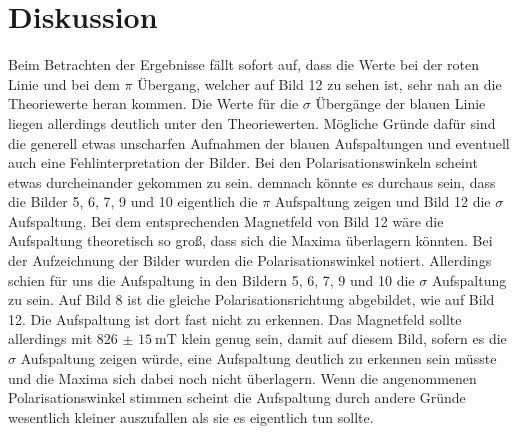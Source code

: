 \documentclass[
  bibliography=totoc,     %
  captions=tableheading,  %
  titlepage=firstiscover, %
]{scrartcl}
\begin{document}
\section{Diskussion}
Beim Betrachten der Ergebnisse fällt sofort auf, dass die Werte bei der roten Linie
und bei dem $\pi$ Übergang, welcher auf Bild 12 zu sehen ist, sehr nah an die Theoriewerte heran kommen.
Die Werte für die $\sigma$ Übergänge der blauen Linie liegen allerdings deutlich unter den Theoriewerten.
Mögliche Gründe dafür sind die generell etwas unscharfen Aufnahmen der blauen Aufspaltungen und eventuell
auch eine Fehlinterpretation der Bilder. Bei den Polarisationswinkeln scheint etwas durcheinander gekommen zu sein.
demnach könnte es durchaus sein, dass die Bilder 5, 6, 7, 9 und 10 eigentlich die $\pi$ Aufspaltung zeigen und Bild 12 die
$\sigma$ Aufspaltung. Bei dem entsprechenden Magnetfeld von Bild 12 wäre die Aufspaltung theoretisch so groß, dass sich die Maxima überlagern
könnten. Bei der Aufzeichnung der Bilder wurden die Polarisationswinkel notiert. Allerdings schien für uns die Aufspaltung in den Bildern 5, 6, 7, 9 und 10
die $\sigma$ Aufspaltung zu sein. Auf Bild 8 ist die gleiche Polarisationsrichtung abgebildet, wie auf Bild 12.
Die Aufspaltung ist dort fast nicht zu erkennen. Das Magnetfeld sollte allerdings mit $\SI{826(15)}{\milli\tesla}$ klein genug sein,
damit auf diesem Bild, sofern es die $\sigma$ Aufspaltung zeigen würde, eine Aufspaltung deutlich zu erkennen sein müsste
und die Maxima sich dabei noch nicht überlagern.
Wenn die angenommenen Polarisationswinkel stimmen scheint die Aufspaltung durch andere Gründe wesentlich kleiner auszufallen
als sie es eigentlich tun sollte.
\newpage
\nocite{*}
\printbibliography
\end{document}
